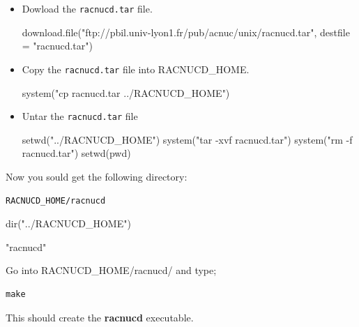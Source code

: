 \documentclass{article}
\begin{document}
\begin{itemize}
\item Dowload the \texttt{racnucd.tar} file.

\begin{Schunk}
\begin{Sinput}
 download.file("ftp://pbil.univ-lyon1.fr/pub/acnuc/unix/racnucd.tar", 
     destfile = "racnucd.tar")
\end{Sinput}
\end{Schunk}

\item Copy the \texttt{racnucd.tar} file into RACNUCD\_HOME.

\begin{Schunk}
\begin{Sinput}
 system("cp racnucd.tar ../RACNUCD_HOME")
\end{Sinput}
\end{Schunk}

\item Untar the \texttt{racnucd.tar} file 

\begin{Schunk}
\begin{Sinput}
 setwd("../RACNUCD_HOME")
 system("tar -xvf racnucd.tar")
 system("rm -f racnucd.tar")
 setwd(pwd)
\end{Sinput}
\end{Schunk}

\end{itemize}
Now you sould get the following directory:
\begin{verbatim}
RACNUCD_HOME/racnucd
\end{verbatim}

\begin{Schunk}
\begin{Sinput}
 dir("../RACNUCD_HOME")
\end{Sinput}
\begin{Soutput}
[1] "racnucd"
\end{Soutput}
\end{Schunk}

Go into RACNUCD\_HOME/racnucd/ and type;
\begin{verbatim}
make
\end{verbatim}
This should create the \textbf{racnucd} executable.
\end{document}
